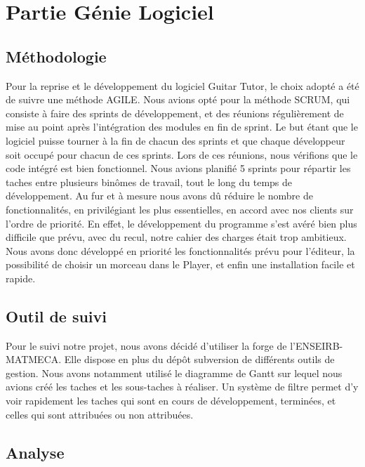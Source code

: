 \chapter{Partie Génie Logiciel}
\section{Méthodologie}

Pour la reprise et le développement du logiciel Guitar Tutor, le choix adopté a été de suivre une méthode AGILE. Nous avions opté pour la méthode SCRUM, qui consiste à faire des sprints de développement, et des réunions régulièrement de mise au point après l’intégration des modules en fin de sprint. Le but étant que le logiciel puisse tourner à la fin de chacun des sprints et que chaque développeur soit occupé pour chacun de ces sprints. Lors de ces réunions, nous vérifions que le code intégré est bien fonctionnel.%
Nous avions planifié 5 sprints pour répartir les taches entre plusieurs binômes de travail, tout le long du temps de développement.  
Au fur et à mesure nous avons dû réduire le nombre de fonctionnalités, en privilégiant les plus essentielles, en accord avec nos clients sur l'ordre de priorité. En effet, le développement du programme s'est avéré bien plus difficile que prévu, avec du recul, notre cahier des charges était trop ambitieux.  Nous avons donc développé en priorité les fonctionnalités prévu pour l’éditeur, la possibilité de choisir un morceau dans le Player, et enfin une installation facile et rapide.

\section{Outil de suivi}

Pour le suivi notre projet, nous avons décidé d’utiliser la forge de l’ENSEIRB-MATMECA. Elle dispose en plus du dépôt subversion de différents outils de gestion. Nous avons notamment utilisé le diagramme de Gantt sur lequel nous avions créé les taches et les sous-taches à réaliser. Un système de filtre permet d'y voir rapidement les taches qui sont en cours de développement, terminées, et celles qui sont attribuées ou non attribuées.

\section{Analyse} 

